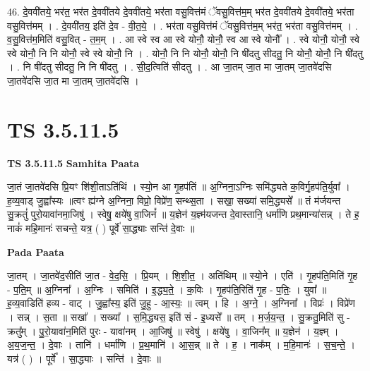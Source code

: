 \documentclass[17pt]{extarticle}
\begin{document}
46. दे॒ववी॑तये॒ भर॑त॒ भर॑त दे॒ववी॑तये दे॒ववी॑तये॒ भर॑ता वसु॒वित्त॑मं ॅवसु॒वित्त॑म॒म् भर॑त दे॒ववी॑तये दे॒ववी॑तये॒ भर॑ता वसु॒वित्त॑मम् । . दे॒ववी॑तय॒ इति॑ दे॒व - वी॒त॒ये॒ । . भर॑ता वसु॒वित्त॑मं ॅवसु॒वित्त॑म॒म् भर॑त॒ भर॑ता वसु॒वित्त॑मम् । . व॒सु॒वित्त॑म॒मिति॑ वसु॒वित् - त॒म॒म् । . आ स्वे स्व आ स्वे योनौ॒ योनौ॒ स्व आ स्वे योनौ᳚ । . स्वे योनौ॒ योनौ॒ स्वे स्वे योनौ॒ नि नि योनौ॒ स्वे स्वे योनौ॒ नि । . योनौ॒ नि नि योनौ॒ योनौ॒ नि षी॑दतु सीदतु॒ नि योनौ॒ योनौ॒ नि षी॑दतु । . नि षी॑दतु सीदतु॒ नि नि षी॑दतु । . सी॒द॒त्विति॑ सीदतु । . आ जा॒तम् जा॒त मा जा॒तम् जा॒तवे॑दसि जा॒तवे॑दसि जा॒त मा जा॒तम् जा॒तवे॑दसि । \newline
\pagebreak
{}

\section{ TS 3.5.11.5 }

\textbf{TS 3.5.11.5 } \newline
\textbf{Samhita Paata} \newline

जा॒तं जा॒तवे॑दसि प्रि॒यꣳ शि॑शी॒ताऽति॑थिं । स्यो॒न आ गृ॒हप॑तिं ॥ अ॒ग्निना॒ऽग्निः समि॑द्ध्यते क॒विर्गृ॒हप॑ति॒र्युवा᳚ । ह॒व्य॒वाड् जु॒ह्वा᳚स्यः ॥त्वꣳ ह्य॑ग्ने अ॒ग्निना॒ विप्रो॒ विप्रे॑ण॒ सन्थ्स॒ता । सखा॒ सख्या॑ समि॒द्ध्यसे᳚ ॥ तं म॑र्जयन्त सु॒क्रतुं॑ पुरो॒यावा॑नमा॒जिषु॑ । स्वेषु॒ क्षये॑षु वा॒जिनं᳚ ॥ य॒ज्ञेन॑ य॒ज्ञ्म॑यजन्त दे॒वास्तानि॒ धर्मा॑णि प्रथ॒मान्या॑सन्न् । ते ह॒ नाकं॑ महि॒मानः॑ सचन्ते॒ यत्र॒ ( ) पूर्वे॑ सा॒द्ध्याः सन्ति॑ दे॒वाः ॥ \newline

\textbf{Pada Paata} \newline

जा॒तम् । जा॒तवे॑द॒सीति॑ जा॒त - वे॒द॒सि॒ । प्रि॒यम् । शि॒शी॒त॒ । अति॑थिम् ॥ स्यो॒ने । एति॑ । गृ॒हप॑ति॒मिति॑ गृ॒ह - प॒ति॒म् ॥ अ॒ग्निना᳚ । अ॒ग्निः । समिति॑ । इ॒द्ध्य॒ते॒ । क॒विः । गृ॒हप॑ति॒रिति॑ गृ॒ह - प॒तिः॒ । युवा᳚ ॥ ह॒व्य॒वाडिति॑ हव्य - वाट् । जु॒ह्वा᳚स्य॒ इति॑ जु॒हु - आ॒स्यः॒ ॥ त्वम् । हि । अ॒ग्ने॒ । अ॒ग्निना᳚ । विप्रः॑ । विप्रे॑ण । सन्न् । स॒ता ॥ सखा᳚ । सख्या᳚ । स॒मि॒द्ध्यस॒ इति॑ सं - इ॒ध्यसे᳚ ॥ तम् । म॒र्ज॒य॒न्त॒ । सु॒क्रतु॒मिति॑ सु - क्रतु᳚म् । पु॒रो॒यावा॑न॒मिति॑ पुरः - यावा॑नम् । आ॒जिषु॑ ॥ स्वेषु॑ । क्षये॑षु । वा॒जिन᳚म् ॥ य॒ज्ञेन॑ । य॒ज्ञ्म् । अ॒य॒ज॒न्त॒ । दे॒वाः । तानि॑ । धर्मा॑णि । प्र॒थ॒मानि॑ । आ॒स॒न्न् ॥ ते । ह॒ । नाक᳚म् । म॒हि॒मानः॑ । स॒च॒न्ते॒ । यत्र॑ ( ) । पूर्वे᳚ । सा॒द्ध्याः । सन्ति॑ । दे॒वाः ॥  \newline
\end{document}
